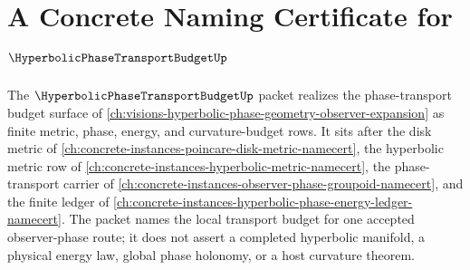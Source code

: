 \chapter{A Concrete Naming Certificate for $\HyperbolicPhaseTransportBudgetUp$}
\label{ch:concrete-instances-hyperbolic-phase-transport-budget-namecert}

The $\HyperbolicPhaseTransportBudgetUp$ packet realizes the phase-transport budget surface of \autoref{ch:visions-hyperbolic-phase-geometry-observer-expansion} as finite metric, phase, energy, and curvature-budget rows. It sits after the disk metric of \autoref{ch:concrete-instances-poincare-disk-metric-namecert}, the hyperbolic metric row of \autoref{ch:concrete-instances-hyperbolic-metric-namecert}, the phase-transport carrier of \autoref{ch:concrete-instances-observer-phase-groupoid-namecert}, and the finite ledger of \autoref{ch:concrete-instances-hyperbolic-phase-energy-ledger-namecert}. The packet names the local transport budget for one accepted observer-phase route; it does not assert a completed hyperbolic manifold, a physical energy law, global phase holonomy, or a host curvature theorem.

